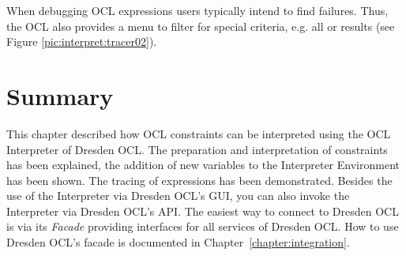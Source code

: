 When debugging OCL expressions users typically intend to find failures. Thus,
the \acs{OCL}  also provides a menu to filter for special
criteria, e.g. all  or  results (see Figure
\ref{pic:interpret:tracer02}).


\section{Summary}
  
This chapter described how \acs{OCL} constraints can be interpreted using the 
\acs{OCL} Interpreter of Dresden OCL. The preparation and interpretation of 
constraints has been explained, the addition of new variables to the 
Interpreter Environment has been shown. The tracing of expressions has been
demonstrated. Besides the use of the Interpreter via 
Dresden OCL's GUI, you can also invoke the Interpreter via Dresden OCL's 
\acs{API}. The easiest way to connect to Dresden OCL is via its \emph{Facade} 
providing interfaces for all services of Dresden OCL. How to use Dresden OCL's 
facade is documented in Chapter~\ref{chapter:integration}.